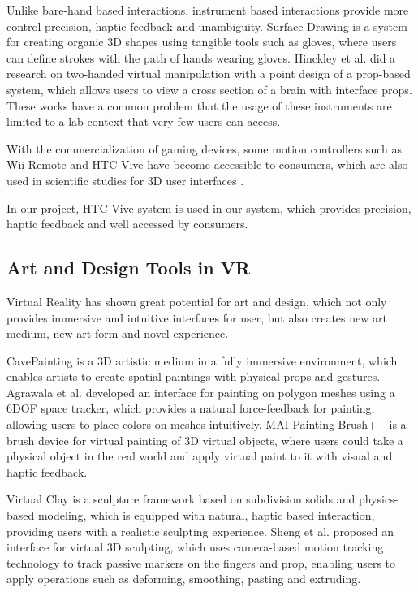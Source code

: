 \documentclass{svjour3}                     %
\begin{document}
Unlike bare-hand based interactions, instrument based interactions provide more control precision, haptic feedback and unambiguity.
Surface Drawing \cite{schkolne2001surface} is a system for creating organic 3D shapes using tangible tools such as gloves, where users can define strokes with the path of hands wearing gloves.
Hinckley et al. \cite{hinckley1998two} did a research on two-handed virtual manipulation with a point design of a prop-based system, which allows users to view a cross section of a brain with interface props.
These works have a common problem that the usage of these instruments are limited to a lab context that very few users can access.

With the commercialization of gaming devices, some motion controllers such as Wii Remote and HTC Vive have become accessible to consumers, which are also used in scientific studies for 3D user interfaces \cite{wingcrave2010wii,niehorster2017accuracy}.

In our project, HTC Vive system is used in our system, which provides precision, haptic feedback and well accessed by consumers.

\subsection{Art and Design Tools in VR}
\label{sec:2.2}
Virtual Reality has shown great potential for art and design, which not only provides immersive and intuitive interfaces for user, but also creates new art medium, new art form and novel experience\cite{laviola20113d}.

CavePainting \cite{keefe2001cavepainting} is a 3D artistic medium in a fully immersive environment, which enables artists to create spatial paintings with physical props and gestures. Agrawala et al.\cite{agrawala19953d} developed an interface for painting on polygon meshes using a 6DOF space tracker, which provides a natural force-feedback for painting, allowing users to place colors on meshes intuitively. MAI Painting Brush++ \cite{otsuki2017brush} is a brush device for virtual painting of 3D virtual objects, where users could take a physical object in the real world and apply virtual paint to it with visual and haptic feedback.

Virtual Clay \cite{mcdonnell2001virtual} is a sculpture framework based on subdivision solids and physics-based modeling, which is equipped with natural, haptic based interaction, providing users with a realistic sculpting experience. Sheng et al. \cite{sheng2006interface} proposed an interface for virtual 3D sculpting, which uses camera-based motion tracking technology to track passive markers on the fingers and prop, enabling users to apply operations such as deforming, smoothing, pasting and extruding.
\end{document}
